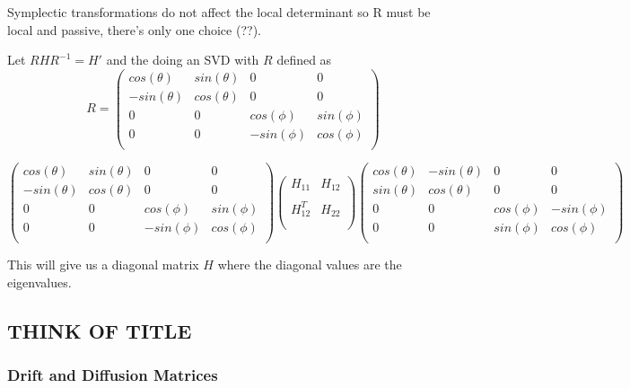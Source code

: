 \documentclass[11pt,a4paper]{article}
\numberwithin{equation}{section}
\begin{document}
	Symplectic transformations do not affect the local determinant so R must be local and passive, there's only one choice (??).
	
	Let $RHR^{-1} = H'$ and the doing an SVD with $R$ defined as
	\begin{equation*}
	R = \begin{pmatrix}
	cos(\theta) & sin(\theta) & 0 & 0\\
	-sin(\theta) & cos(\theta) & 0 & 0\\
	0 & 0 & cos(\phi) & sin(\phi) \\
	0 & 0 & -sin(\phi) & cos(\phi)\\
	\end{pmatrix}
	\end{equation*}

	\begin{equation*}
	\begin{pmatrix}
	cos(\theta) & sin(\theta) & 0 & 0\\
	-sin(\theta) & cos(\theta) & 0 & 0\\
	0 & 0 & cos(\phi) & sin(\phi) \\
	0 & 0 & -sin(\phi) & cos(\phi)\\
	\end{pmatrix}	\begin{pmatrix}
	H_{11} & H_{12}\\
	\\
	H^{T}_{12} & H_{22} \\
	\\
	\end{pmatrix}	\begin{pmatrix}
	cos(\theta) & -sin(\theta) & 0 & 0\\
	sin(\theta) & cos(\theta) & 0 & 0\\
	0 & 0 & cos(\phi) & -sin(\phi) \\
	0 & 0 & sin(\phi) & cos(\phi)\\
	\end{pmatrix}
	\end{equation*}	
	
	This will give us a diagonal matrix $H$ where the diagonal values are the eigenvalues. 
	\fi
	
	\subsection{THINK OF TITLE}\color{black}
	\subsubsection{Drift and Diffusion Matrices}
	\label{sec:optodefs}	
\end{document}
